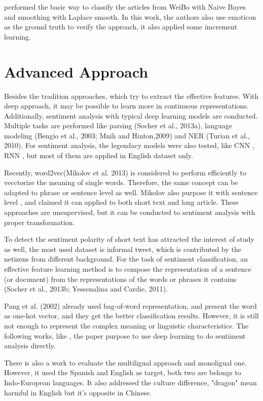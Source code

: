 \cite{zhao2012moodlens} performed the basic way to classify the articles from WeiBo with Naive Bayes and smoothing with Laplace smooth.  
In this work, the authors also use emoticon as the ground truth to verify the approach, it also applied some imcrement learning. \\


\section{Advanced Approach}

Besides the tradition approaches, which try to extract the effective features. With deep approach, it may be possible to learn more in  continuous representations.
Additionally, sentiment analysis with typical deep learning models are conducted. Multiple tasks are performed like  parsing (Socher et al., 2013a), language
modeling (Bengio et al., 2003; Mnih and Hinton,2009) and NER (Turian et al., 2010). For sentiment analysis, the legendacy models were also tested, like CNN \cite{kim2014convolutional}, RNN \cite{arevian2007recurrent}, but most of them are applied in English dataset only. 

Recently, word2vec(Mikolov et al. 2013)\cite{word2vec} is considered to perform efficiently to vecctorize the meaning of single words. Therefore, the same concept can be adapted to phrase or sentence level as well.
Mikolov also purpose it with sentence level \cite{PVDB}, and claimed it can applied to both short text and long article. These approaches are unsupervised, but it can be conducted to sentiment analysis with proper transformation. 

To detect the sentiment polarity of short text has attracted the interest of study as well, the most used dataset is informal tweet, which is contributed by the netizens from different background. 
For the task of sentiment classification, an effective feature learning method is to compose the representation of a
sentence (or document) from the representations of the words or phrases it contains (Socher et al., 2013b; Yessenalina and Cardie, 2011).

Pang et al. (2002)\cite{pang2002thumbs} already used bag-of-word representation, and present the word as one-hot vector, and they get the better classification results. However, it is still not enough to represent the complex meaning or linguistic characteristics.
The following works, like \cite{tang2014learning}, the paper purpose to use deep learning to do sentiment analysis directly.

There is also a work\cite{multilingual} to evaluate the multiligual approach and monoligual one. However, it used the Spanish and English as target, both two are belongs 
to Indo-European languages. It also addressed the culture difference, "dragon" mean harmful in English but it's opposite in Chinese. 
